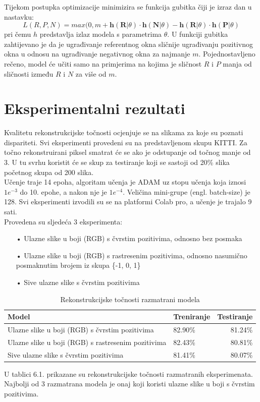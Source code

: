 \documentclass[times, utf8, zavrsni, numeric]{fer}
\begin{document}
\pagebreak
Tijekom postupka optimizacije minimizira se funkcija gubitka čiji je izraz dan u nastavku:
\begin{equation}
L(R, P, N) = max(0, m + \textbf{h}(\textbf{R}|\theta)\cdot \textbf{h}(\textbf{N}|\theta)-\textbf{h}(\textbf{R}|\theta)\cdot \textbf{h}(\textbf{P}|\theta)
\label{eq:gubitak}
\end{equation}
pri čemu $h$ predstavlja izlaz modela s parametrima $\theta$. U funkciji gubitka zahtijevano je da je ugrađivanje referentnog okna sličnije ugrađivanju pozitivnog okna u odnosu na ugrađivanje negativnog okna za najmanje $m$. Pojednostavljeno rečeno, model će učiti samo na primjerima na kojima je sličnost $R$ i $P$ manja od sličnosti između $R$ i $N$ za više od $m$.\cite{orsic}

\chapter{Eksperimentalni rezultati}
Kvalitetu rekonstrukcijske točnosti ocjenjuje se na slikama za koje su poznati dispariteti. Svi eksperimenti provedeni su na predstavljenom skupu KITTI. Za točno rekonstruirani piksel smatrat će se ako je odstupanje od točnog manje od 3. U tu svrhu koristit će se skup za testiranje koji se sastoji od 20\% slika početnog skupa od 200 slika.\\
Učenje traje 14 epoha, algoritam učenja je ADAM uz stopu učenja koja iznosi $1e^{-3}$ do 10. epohe, a nakon nje je $1e^{-4}$. Veličina mini-grupe (engl. batch-size) je 128.  Svi eksperimenti izvodili su se na platformi Colab pro, a učenje je trajalo 9 sati.\\
Provedena su sljedeća 3 eksperimenta:
\begin{itemize}
\item[•]Ulazne slike u boji (RGB) s čvrstim pozitivima, odnosno bez posmaka
\item[•]Ulazne slike u boji (RGB) s rastresenim pozitivima, odnosno nasumično \linebreak posmaknutim brojem iz skupa \{-1, 0, 1\}
\item[•]Sive ulazne slike s čvrstim pozitivima
\end{itemize}

\begin{table}[htb]
\caption{Rekonstrukcijske točnosti razmatrani modela}
\label{tbl:konstante}
\centering
\begin{tabular}{llr} \hline
Model & Treniranje & Testiranje\\ \hline
Ulazne slike u boji (RGB) s čvrstim pozitivima & 82.90\% & 81.24\% \\
Ulazne slike u boji (RGB) s rastresenim pozitivima & 82.43\% & 80.81\% \\
Sive ulazne slike s čvrstim pozitivima & 81.41\% & 80.07\% \\ \hline
\end{tabular}
\end{table}
U tablici 6.1. prikazane su rekonstrukcijske točnosti razmatranih eksperimenata. Najbolji od 3 razmatrana modela je onaj koji koristi ulazne slike u boji s čvrstim pozitivima.\pagebreak
\end{document}
